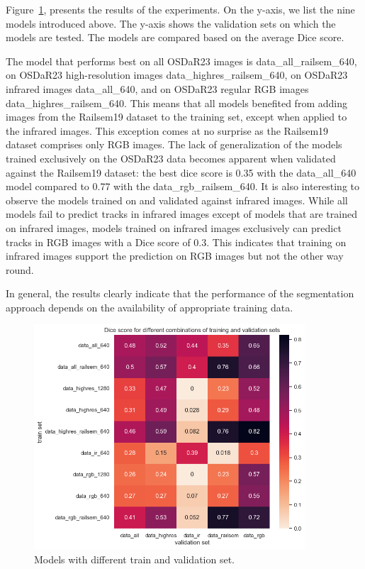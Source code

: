 \documentclass[Master,MDS,english]{BASE/twbook} %
\begin{document}
Figure~\ref{fig:yolo_models}, presents the results of the experiments. On the y-axis, we list the nine models introduced above. The y-axis shows the validation sets on which the models are tested. The models are compared based on the average Dice score.

 The model that performs best on all OSDaR23 images is data\_all\_railsem\_640, on OSDaR23 high-resolution images data\_highres\_railsem\_640, on OSDaR23 infrared images data\_all\_640, and on OSDaR23 regular RGB images data\_highres\_railsem\_640. This means that all models benefited from adding images from the Railsem19 dataset to the training set, except when applied to the infrared images. This exception comes at no surprise as the Railsem19 dataset comprises only RGB images.
 The lack of generalization of the models trained exclusively on the OSDaR23 data becomes apparent when validated against the Railsem19 dataset: the best dice score is 0.35 with the data\_all\_640 model compared to 0.77 with the data\_rgb\_railsem\_640.
It is also interesting to observe the models trained on and validated against infrared images. While all models fail to predict tracks in infrared images except of models that are trained on infrared images, models trained on infrared images exclusively can predict tracks in RGB images with a Dice score of 0.3. This indicates that training on infrared images support the prediction on RGB images but not the other way round. 

In general, the results clearly indicate that the performance of the segmentation approach depends on the availability of appropriate training data. 


 

\begin{figure}[h]
\centering
\includegraphics[width=0.9\textwidth]{images/yolo/models}
\caption{Models with different train and validation set.  }
\label{fig:yolo_models}
\end{figure}
\end{document}
